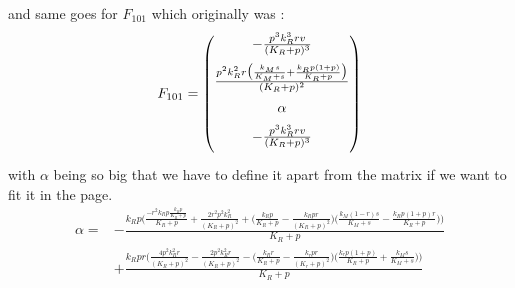 \documentclass{tudelft-report}
\begin{document}
and same goes for $F_{101}$ which originally was :
$$F_{101} = 
\begin{pmatrix}
 \vspace{0.2cm}
 -\frac{p^3k_R^3rv}{(K_R+p)^3}\\
  \vspace{0.2cm}
 \frac{p^2k_R^2r\big(\frac{k_Ms}{K_M+s} + \frac{k_Rp(1+p)}{K_R+p}\big)}{(K_R+p)^2}\\
  \vspace{0.2cm}
 \alpha\\
  \vspace{0.2cm}
 -\frac{p^3k_R^3rv}{(K_R+p)^3}
\end{pmatrix}
$$ with $\alpha$ being so big that we have to define it apart from the matrix if we want to fit it in the page.
\begin{align*}
 \alpha = &-\frac{k_Rp\bigg(\frac{-r^2k_Rp\frac{k_Rp}{K_R+p}}{K_R+p} + \frac{2r^2p^2k_R^2}{(K_R+p)^2} + \big(\frac{k_Rp}{K_R+p}-\frac{k_Rpr}{(K_R+p)^2}\big)\big(\frac{k_M(1-r)s}{K_M+s}-\frac{k_Rp(1+p)r}{K_R+p}\big)\bigg)}{K_R+p} \\&+ \frac{k_Rpr\bigg(\frac{4p^2k_R^2r}{(K_R+p)^2}-\frac{2p^2k_R^2r}{(K_R+p)^2}-\big(\frac{k_Rr}{K_R+p}-\frac{k_rpr}{(K_r+p)^2}\big)\big(\frac{k_rp(1+p)}{K_R+p}+\frac{k_Ms}{K_M+s}\big)\bigg)}{K_R+p}
\end{align*}
\end{document}
